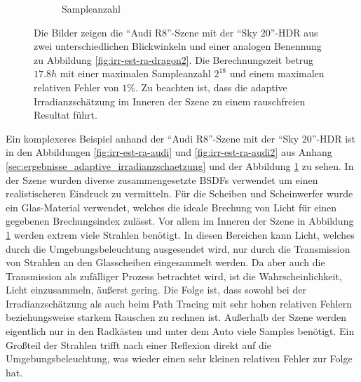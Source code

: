 \begin{figure}[h]
\begin{subfigure}[t]{0.5\textwidth}
				\caption{Sampleanzahl}
			\end{subfigure}
			\caption[Vertex Lighting anhand der \enquote{Audi R8}-Szene mit \enquote{Sky 20}-HDR]{Die Bilder zeigen die \enquote{Audi R8}-Szene mit der \enquote{Sky 20}-HDR aus zwei unterschiedlichen Blickwinkeln und einer analogen Benennung zu Abbildung \ref{fig:irr-est-ra-dragon2}. Die Berechnungszeit betrug $17.8\unit{h}$ mit einer maximalen Sampleanzahl $2^{18}$ und einem maximalen relativen Fehler von $1\unit{\%}$. Zu beachten ist, dass die adaptive Irradianzschätzung im Inneren der Szene zu einem rauschfreien Resultat führt.}
			\label{fig:irr-est-ra-audi3}
		\end{figure}

		\FloatBarrier

		Ein komplexeres Beispiel anhand der \enquote{Audi R8}-Szene mit der \enquote{Sky 20}-HDR ist in den Abbildungen \ref{fig:irr-est-ra-audi} und \ref{fig:irr-est-ra-audi2} aus Anhang \ref{sec:ergebnisse_adaptive_irradianzschaetzung} und der Abbildung \ref{fig:irr-est-ra-audi3} zu sehen.
		In der Szene wurden diverse zusammengesetzte BSDFs verwendet um einen realistischeren Eindruck zu vermitteln.
		Für die Scheiben und Scheinwerfer wurde ein Glas-Material verwendet, welches die ideale Brechung von Licht für einen gegebenen Brechungsindex zulässt.
		Vor allem im Inneren der Szene in Abbildung \ref{fig:irr-est-ra-audi3} werden extrem viele Strahlen benötigt.
		In diesen Bereichen kann Licht, welches durch die Umgebungsbeleuchtung ausgesendet wird, nur durch die Transmission von Strahlen an den Glasscheiben eingesammelt werden.
		Da aber auch die Transmission als zufälliger Prozess betrachtet wird, ist die Wahrscheinlichkeit, Licht einzusammeln, äußerst gering.
		Die Folge ist, dass sowohl bei der Irradianzschätzung als auch beim Path Tracing mit sehr hohen relativen Fehlern beziehungsweise starkem Rauschen zu rechnen ist.
		Außerhalb der Szene werden eigentlich nur in den Radkästen und unter dem Auto viele Samples benötigt.
		Ein Großteil der Strahlen trifft nach einer Reflexion direkt auf die Umgebungsbeleuchtung, was wieder einen sehr kleinen relativen Fehler zur Folge hat.

